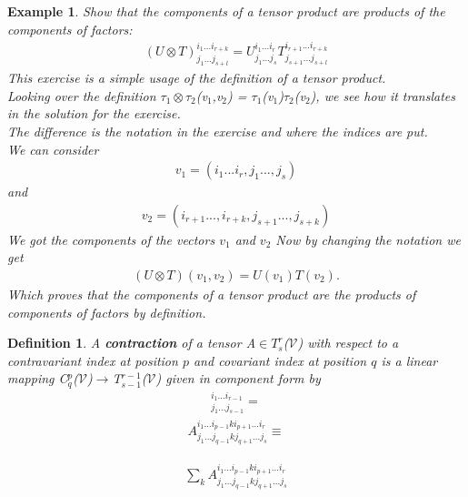 \documentclass[12pt,a4paper]{article}
\newtheorem{defn}[thm]{Definition}
\newtheorem{exmp}{Example}[section]
\begin{document}
\begin{exmp}
Show that the components of a tensor product are products of the components of factors:
\begin{align*}
(U \otimes T)^{i_1 ... i_{r+k}}_{j_1 ... j_{s+l}} = U ^{i_1 ... i_{r}}_{j_1 ... j_{s}} T ^{i_{r+1} ... i_{r+k}}_{j_{s+1}... j_{s+l}}
\end{align*}
This exercise is a simple usage of the definition of a tensor product.\\
Looking over the definition $\tau_1\otimes \tau_2$(v$_1$,v$_2$) = $\tau_1$(v$_1$)$\tau_2$(v$_2$), we see how it translates in the solution for the exercise.\\
The difference is the notation in the exercise and where the indices are put. \\
We can consider
\begin{align*}
v_1 = (i_1... i_r, j_1 ..., j_s)
\end{align*}
and
\begin{align*}
v_2 = (i_{r+1} ..., i_{r+k}, j_{s+1} ... ,j_{s+k})
\end{align*}
We got the components of the vectors $v_1$ and $v_2$
Now by changing the notation we get\\
\begin{align*}
(U \otimes T)(v_1, v_2) = U (v_1) T (v_2).
\end{align*}
Which proves that the components of a tensor product are the products of components of factors by definition.
\end{exmp}
\begin{defn}
A \textbf{contraction} of a tensor A$\in T^r_s$($\mathcal{V}$) with respect to a contravariant index at position $p$ and covariant index at position $q$ is a linear mapping C$^p_q$($\mathcal{V}$)$\to$T$^{r-1}_{s-1}$($\mathcal{V}$) given in \textit{component form} by
\begin{align*}
	[C^p_q(A)]^{i_1...i_{r-1}}_{j_1...j_{s-1}} = 
\end{align*}
\begin{align*}
A ^{i_1...i_{p-1}ki_{p+1}...i_r}_{j_1...j_{q-1}kj_{q+1}...j_s}  \equiv
\end{align*}

\begin{align*}
 \sum_{k}A ^{i_1...i_{p-1}ki_{p+1}...i_r}_{j_1...j_{q-1}kj_{q+1}...j_s}
\end{align*}
\end{defn}
\end{document}
